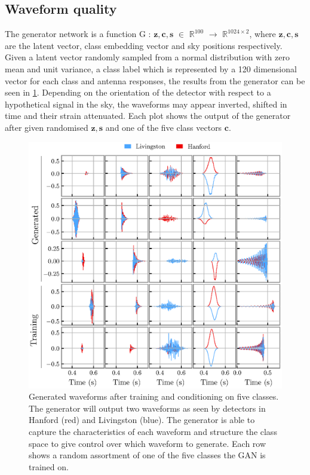\documentclass[12pt]{iopart}
\begin{document}
\subsection{Waveform quality}
The generator network is a function G : $\mathbf{z},\mathbf{c},\mathbb{\textbf{s}}$ $\in$ $\mathbb{R}^{100}$ $\to$ $\mathbb{R}^{1024\times2}$, where $\mathbf{z},\mathbf{c},\mathbb{\textbf{s}}$ are the latent vector, class embedding vector and sky positions respectively. Given a latent vector randomly sampled from a normal distribution with zero mean and unit variance, a class label which is represented by a 120 dimensional vector for each class and antenna responses, the results from the generator can be seen in \cref{fig:gen_signals}. Depending on the orientation of the detector with respect to a hypothetical signal in the sky, the waveforms may appear inverted, shifted in time and their strain attenuated. Each plot shows the output of the generator after given randomised $\mathbf{z}, \mathbb{\textbf{s}}$ and one of the five class vectors $\mathbf{c}$.

\begin{figure}[ht]
    \centering
    \includegraphics[width=\textwidth]{figures/gens+taining.eps}
    \caption{Generated waveforms after training and conditioning on five classes. The generator will output two waveforms as seen by detectors in Hanford (red) and Livingston (blue). The generator is able to capture the characteristics of each waveform and structure the class space to give control over which waveform to generate. Each row shows a random assortment of one of the five classes the GAN is trained on. }
    \label{fig:gen_signals}
\end{figure}
\end{document}
